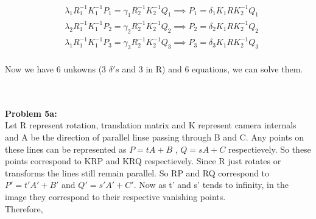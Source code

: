 \documentclass[a4paper]{article}
\begin{document}
\begin{equation*}
\begin{split}
&\lambda_1^{}R_1^{-1}K_1^{-1}P_1 = \gamma_1^{}R_2^{-1}K_2^{-1}Q_1 \implies P_1 = \delta_1K_1RK_2^{-1}Q_1\\
&\lambda_2^{}R_1^{-1}K_1^{-1}P_2 = \gamma_2^{}R_2^{-1}K_2^{-1}Q_2 \implies P_2 = \delta_2K_1RK_2^{-1}Q_2\\
&\lambda_1^{}R_1^{-1}K_1^{-1}P_3 = \gamma_3^{}R_2^{-1}K_2^{-1}Q_3 \implies P_3 = \delta_3K_1RK_2^{-1}Q_3\\
\end{split}
\end{equation*}

Now we have 6 unkowns (3 $\delta 's$ and 3 in R) and 6 equations, we can solve them.

\hrulefill\\ \\



\textbf{Problem 5a:} \\
Let R represent rotation, translation matrix and K represent camera internals and A be the direction of parallel linse passing through B and C. Any points on these lines can be represented as $P=tA+B$ , $Q=sA+C$ respectievely. So these points correspond to KRP and KRQ respectievely. Since R just rotates or transforms the lines still remain parallel. So RP and RQ correspond to $P' = t'A'+B'$ and $Q'=s'A'+C'$. Now as t' and s' tends to infinity, in the image they correspond to their respective vanishing points.\\
Therefore, 
\end{document}

